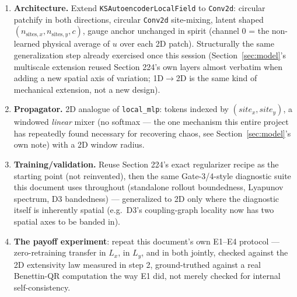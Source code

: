\documentclass[11pt]{article}
\begin{document}
\begin{enumerate}[nosep]
  snapshots $u(x,y,t)$.
\item \textbf{Architecture.} Extend \texttt{KSAutoencoderLocalField} to
  \texttt{Conv2d}: circular patchify in both directions, circular
  \texttt{Conv2d} site-mixing, latent shaped $(n_{\mathrm{sites},x},
  n_{\mathrm{sites},y}, c)$, gauge anchor unchanged in spirit (channel 0
  = the non-learned physical average of $u$ over each 2D patch).
  Structurally the same generalization step already exercised once this
  session (Section~\ref{sec:model}'s multiscale extension reused
  Section 224's own layers almost verbatim when adding a new spatial
  axis of variation; 1D$\to$2D is the same kind of mechanical
  extension, not a new design).
\item \textbf{Propagator.} 2D analogue of \texttt{local\_mlp}: tokens
  indexed by $(site_x, site_y)$, a windowed \emph{linear} mixer (no
  softmax --- the one mechanism this entire project has repeatedly
  found necessary for recovering chaos, see
  Section~\ref{sec:model}'s own note) with a 2D window radius.
\item \textbf{Training/validation.} Reuse Section 224's exact
  regularizer recipe as the starting point (not reinvented), then the
  same Gate-3/4-style diagnostic suite this document uses throughout
  (standalone rollout boundedness, Lyapunov spectrum, D3
  bandedness) --- generalized to 2D only where the diagnostic itself is
  inherently spatial (e.g.\ D3's coupling-graph locality now has two
  spatial axes to be banded in).
\item \textbf{The payoff experiment}: repeat this document's own
  E1--E4 protocol --- zero-retraining transfer in $L_x$, in $L_y$, and
  in both jointly, checked against the 2D extensivity law measured in
  step 2, ground-truthed against a real Benettin-QR computation the way
  E1 did, not merely checked for internal self-consistency.
\end{enumerate}
\end{document}
